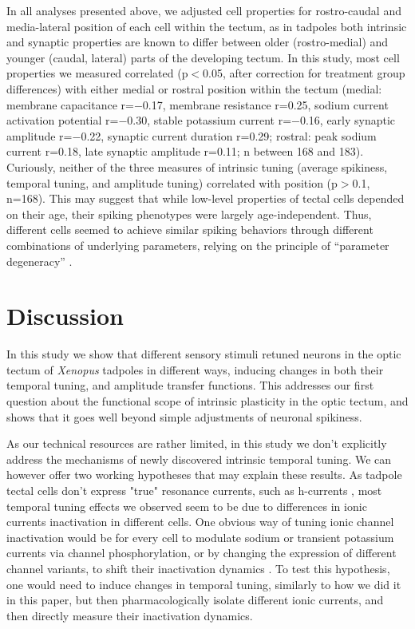 \documentclass{article}
\begin{document}
In all analyses presented above, we adjusted cell properties for rostro-caudal and media-lateral position of each cell within the tectum, as in tadpoles both intrinsic \citep{hamodi2014} and synaptic properties \citep{wu1996,khakhalin2012} are known to differ between older (rostro-medial) and younger (caudal, lateral) parts of the developing tectum. In this study, most cell properties we measured correlated (p$<$0.05, after correction for treatment group differences) with either medial or rostral position within the tectum (medial: membrane capacitance r=$-$0.17, membrane resistance r=0.25, sodium current activation potential r=$-$0.30, stable potassium current r=$-$0.16, early synaptic amplitude r=$-$0.22, synaptic current duration r=0.29; rostral: peak sodium current r=0.18, late synaptic amplitude r=0.11; n between 168 and 183). Curiously, neither of the three measures of intrinsic tuning (average spikiness, temporal tuning, and amplitude tuning) correlated with position (p$>$0.1, n=168). This may suggest that while low-level properties of tectal cells depended on their age, their spiking phenotypes were largely age-independent. Thus, different cells seemed to achieve similar spiking behaviors through different combinations of underlying parameters, relying on the principle of “parameter degeneracy” \citep{prinz2004degeneracy,drion2015}.


\section*{Discussion}

In this study we show that different sensory stimuli retuned neurons in the optic tectum of \textit{Xenopus} tadpoles in different ways, inducing changes in both their temporal tuning, and amplitude transfer functions. This addresses our first question about the functional scope of intrinsic plasticity in the optic tectum, and shows that it goes well beyond simple adjustments of neuronal spikiness.

As our technical resources are rather limited, in this study we don't explicitly address the mechanisms of newly discovered intrinsic temporal tuning. We can however offer two working hypotheses that may explain these results. As tadpole tectal cells don't express "true" resonance currents, such as h-currents \citep{ciarleglio2015}, most temporal tuning effects we observed seem to be due to differences in ionic currents inactivation in different cells. One obvious way of tuning ionic channel inactivation would be for every cell to modulate sodium or transient potassium currents via channel phosphorylation, or by changing the expression of different channel variants, to shift their inactivation dynamics \citep{frank2003nachannels,goldwyn2018a_current}. To test this hypothesis, one would need to induce changes in temporal tuning, similarly to how we did it in this paper, but then pharmacologically isolate different ionic currents, and then directly measure their inactivation dynamics.
\end{document}

